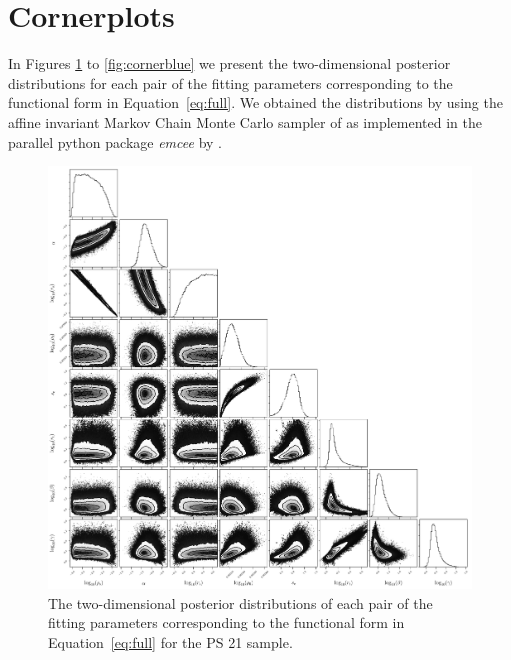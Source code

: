 \documentclass[iop, apjl, twocolappendix, numberedappendix]{emulateapj}
\begin{document}
\section{Cornerplots}
\label{sec:cornerplots}
In Figures \ref{fig:corner_21} to \ref{fig:cornerblue} we present
the two-dimensional posterior distributions for each pair of the
fitting parameters corresponding to the functional
form in Equation~\ref{eq:full}. We obtained the distributions by  using the
affine invariant Markov Chain Monte Carlo sampler of
\citet{goodman2010ensemble} as implemented in the parallel python
package {\it emcee} by \citet{foreman2013emcee}.
\begin{figure}
    \includegraphics[width= \textwidth]{corner21.pdf}
\caption{The two-dimensional posterior distributions of each pair of
the fitting parameters corresponding to the functional
form in Equation~\ref{eq:full} for the PS 21 sample. 
}
   \label{fig:corner_21} 
\end{figure}
\end{document}
